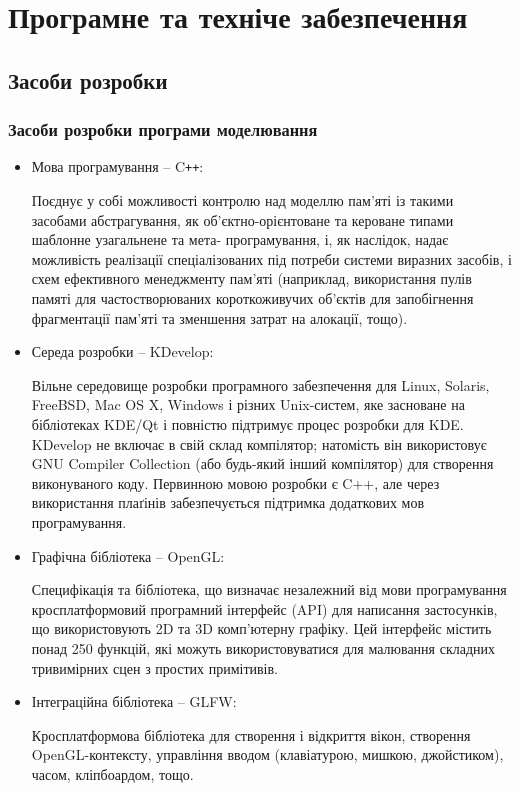 \section{Програмне та техніче забезпечення}
\subsection{Засоби розробки}
\subsubsection{Засоби розробки програми моделювання}
\begin{itemize}[label=\Large$\diamond$]\itemsep1em
  \item Мова програмування -- C\verb!++!:

    Поєднує у собі можливості контролю над моделлю пам'яті із такими засобами абстрагування, як об'єктно-орієнтоване та кероване типами шаблонне узагальнене та мета- програмування, і, як наслідок, надає можливість реалізації спеціалізованих під потреби системи виразних засобів, і схем ефективного менеджменту пам'яті (наприклад, використання пулів памяті для частостворюваних короткоживучих об'єктів для запобігнення фрагментації пам'яті та зменшення затрат на алокації, тощо).

  \item Середа розробки -- KDevelop:

    Вільне середовище розробки програмного забезпечення для Linux, Solaris, FreeBSD, Mac OS X, Windows і різних Unix-систем, яке засноване на бібліотеках KDE/Qt і повністю підтримує процес розробки для KDE. KDevelop не включає в свій склад компілятор; натомість він використовує GNU Compiler Collection (або будь-який інший компілятор) для створення виконуваного коду. Первинною мовою розробки є C++, але через використання плаґінів забезпечується підтримка додаткових мов програмування.

  \item Графічна бібліотека -- OpenGL:

    Специфікація та бібліотека, що визначає незалежний від мови програмування кросплатформовий програмний інтерфейс (API) для написання застосунків, що використовують 2D та 3D комп'ютерну графіку. Цей інтерфейс містить понад 250 функцій, які можуть використовуватися для малювання складних тривимірних сцен з простих примітивів.

  \item Інтеграційна бібліотека -- GLFW:

    Кросплатформова бібліотека для створення і відкриття вікон, створення OpenGL-контексту, управління вводом (клавіатурою, мишкою, джойстиком), часом, кліпбоардом, тощо.


\end{itemize}
